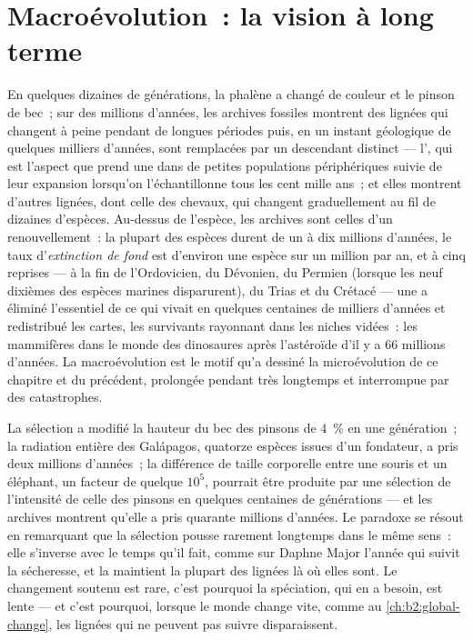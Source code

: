 \section{Macroévolution~: la vision à long terme}

\begin{proposition}\label{prop:b2:speciation:tempo}
En quelques dizaines de générations, la phalène a changé de couleur et le
pinson de bec~; sur des millions d'années, les archives fossiles montrent
des lignées qui changent à peine pendant de longues périodes puis, en un
instant géologique de quelques milliers d'années, sont remplacées par un
descendant distinct --- l'\emph{}, qui est l'aspect que
prend une  dans de petites populations
périphériques suivie de leur expansion lorsqu'on l'échantillonne tous les
cent mille ans~; et elles montrent d'autres lignées, dont celle des
chevaux, qui changent graduellement au fil de dizaines d'espèces.
Au-dessus de l'espèce, les archives sont celles d'un renouvellement~: la
plupart des espèces durent de un à dix millions d'années, le taux
d'\emph{extinction de fond} est d'environ une espèce sur un
million par an, et à cinq reprises --- à la fin de l'Ordovicien, du
Dévonien, du Permien (lorsque les neuf dixièmes des espèces marines
disparurent), du Trias et du Crétacé --- une \emph{} a
éliminé l'essentiel de ce qui vivait en quelques centaines de milliers
d'années et redistribué les cartes, les survivants rayonnant dans les
niches vidées~: les mammifères dans le monde des dinosaures après
l'astéroïde d'il y a 66 millions d'années. La macroévolution est le
motif qu'a dessiné la microévolution de ce chapitre et du précédent,
prolongée pendant très longtemps et interrompue par des catastrophes.
\end{proposition}

\begin{example}\label{ex:b2:speciation:rates}
La sélection a modifié la hauteur du bec des pinsons de \qty{4}{\%} en une
génération~; la radiation entière des Galápagos, quatorze espèces issues
d'un fondateur, a pris deux millions d'années~; la différence de taille
corporelle entre une souris et un éléphant, un facteur de quelque
$10^{5}$, pourrait être produite par une sélection de l'intensité de
celle des pinsons en quelques centaines de générations ---
et les archives montrent qu'elle a pris quarante millions d'années. Le
paradoxe se résout en remarquant que la sélection pousse rarement
longtemps dans le même sens~: elle s'inverse avec le temps qu'il fait,
comme sur Daphne Major l'année qui suivit la sécheresse, et la  maintient la plupart des lignées là où elles sont. Le
changement soutenu est rare, c'est pourquoi la spéciation, qui en a
besoin, est lente --- et c'est pourquoi, lorsque le monde change vite,
comme au \cref{ch:b2:global-change}, les lignées qui ne peuvent pas suivre
disparaissent.
\end{example}

